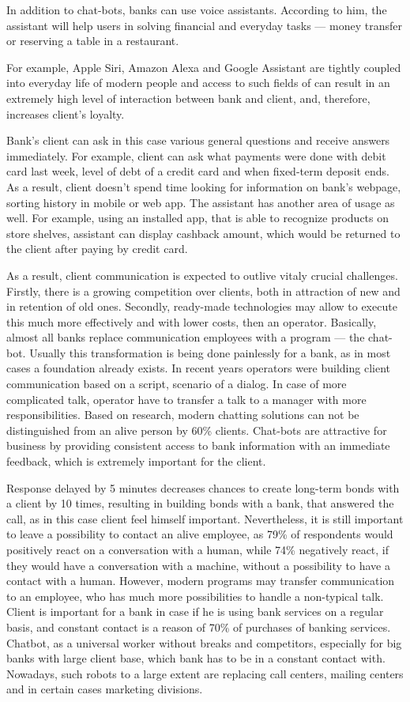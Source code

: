 In addition to chat-bots, banks can use voice assistants.
According to him, the assistant will help users in solving financial and everyday tasks — money transfer or reserving a table in a restaurant.

For example, Apple Siri, Amazon Alexa and Google Assistant are tightly coupled into everyday life of modern people and access to such fields of can result in an extremely high level of interaction between bank and client, and, therefore, increases client's loyalty. 

Bank's client can ask in this case various general questions and receive answers immediately.
For example, client can ask what payments were done with debit card last week, 
level of debt of a credit card and when fixed-term deposit ends.
As a result, client doesn't spend time looking for information on bank's webpage, sorting history in mobile or web app.
The assistant has another area of usage as well. 
For example, using an installed app, that is able to recognize products on store shelves, assistant can display cashback amount, which would be returned to the client after paying by credit card.

As a result, client communication is expected to outlive vitaly crucial challenges. 
Firstly, there is a growing competition over clients, both in attraction of new and in retention of old ones.
Secondly, ready-made technologies may allow to execute this much more effectively and with lower costs, then an operator.
Basically, almost all banks replace communication employees with a program — the chat-bot.
Usually this transformation is being done painlessly for a bank, as in most cases a foundation already exists.
In recent years operators were building client communication based on a script, scenario of a dialog.
In case of more complicated talk, operator have to transfer a talk to a manager with more responsibilities.
Based on research, modern chatting solutions can not be distinguished from an alive person by 60\% clients.
Chat-bots are attractive for business by providing consistent access to bank information with an immediate feedback, which is extremely important for the client.

Response delayed by 5 minutes decreases chances to create long-term bonds with a client by 10 times, resulting in building bonds with a bank, that answered the call, as in this case client feel himself important. 
Nevertheless, it is still important to leave a possibility to contact an alive employee, as 79\% of respondents would positively react on a conversation with a human,
while 74\% negatively react, if they would have a conversation with a machine, without a possibility to have a contact with a human.
However, modern programs may transfer communication to an employee, who has much more possibilities to handle a non-typical talk.
Client is important for a bank in case if he is using bank services on a regular basis, and constant contact is a reason of 70\% of purchases of banking services.
Chatbot, as a universal worker without breaks and competitors, especially for big banks with large client base, which bank has to be in a constant contact with.
Nowadays, such robots to a large extent are replacing call centers, mailing centers and in certain cases marketing divisions.


